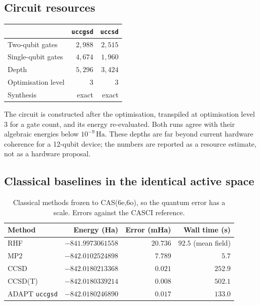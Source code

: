 \documentclass[11pt,a4paper]{article}
\newcommand{\Ha}{\ensuremath{\,\mathrm{Ha}}}
\newcommand{\code}[1]{\texttt{\small #1}}
\begin{document}
\subsection{Circuit resources}

\begin{center}
\small
\begin{tabular}{lrr}
\toprule
& \code{uccgsd} & \code{uccsd} \\
\midrule
Two-qubit gates    & $2{,}988$ & $2{,}515$ \\
Single-qubit gates & $4{,}674$ & $1{,}960$ \\
Depth              & $5{,}296$ & $3{,}424$ \\
Optimisation level & $3$       & $3$ \\
Synthesis          & exact     & exact \\
\bottomrule
\end{tabular}
\end{center}

The circuit is constructed after the optimisation, transpiled at optimisation
level 3 for a gate count, and its energy re-evaluated. Both runs agree with
their algebraic energies below $10^{-9}\Ha$. These depths are far beyond current
hardware coherence for a 12-qubit device; the numbers are reported as a resource
estimate, not as a hardware proposal.

\subsection{Classical baselines in the identical active space}

\begin{table}[htbp]
\centering
\caption{Classical methods frozen to CAS(6e,6o), so the quantum error has a
scale. Errors against the CASCI reference.}
\label{tab:classical}
\small
\begin{tabular}{lrrr}
\toprule
Method & Energy (Ha) & Error (mHa) & Wall time (s) \\
\midrule
RHF        & $-841.9973061558$ & $20.736$ & $92.5$ (mean field) \\
MP2        & $-842.0102524898$ & $7.789$  & $5.7$ \\
CCSD       & $-842.0180213368$ & $0.021$  & $252.9$ \\
CCSD(T)    & $-842.0180339214$ & $\mathbf{0.008}$ & $502.1$ \\
\midrule
ADAPT \code{uccgsd} & $-842.0180246890$ & $0.017$ & $\mathbf{133.0}$ \\
\bottomrule
\end{tabular}
\end{table}
\end{document}
